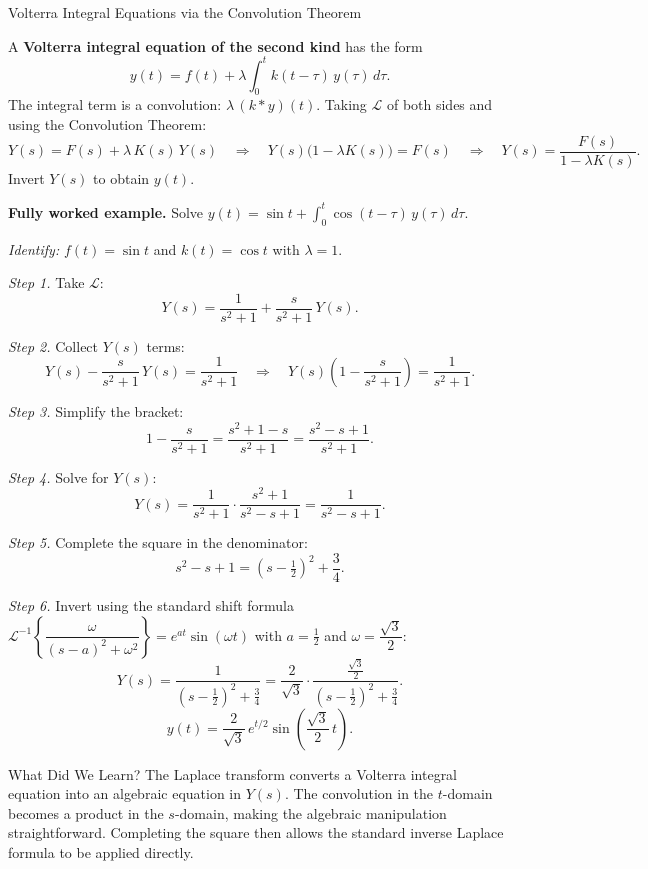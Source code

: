 \documentclass[12pt,a4paper]{article}
\begin{document}
\begin{infobox}{Volterra Integral Equations via the Convolution Theorem}

A \textbf{Volterra integral equation of the second kind} has the form
\[
  y(t) = f(t) + \lambda\int_0^t k(t-\tau)\,y(\tau)\,d\tau.
\]
The integral term is a convolution: $\lambda\,(k * y)(t)$.
Taking $\mathcal{L}$ of both sides and using the Convolution Theorem:
\[
  Y(s) = F(s) + \lambda\,K(s)\,Y(s)
  \quad\Longrightarrow\quad
  Y(s)\bigl(1 - \lambda K(s)\bigr) = F(s)
  \quad\Longrightarrow\quad
  Y(s) = \frac{F(s)}{1-\lambda K(s)}.
\]
Invert $Y(s)$ to obtain $y(t)$.

\medskip
\textbf{Fully worked example.} Solve
$\displaystyle y(t) = \sin t + \int_0^t \cos(t-\tau)\,y(\tau)\,d\tau$.

\textit{Identify:} $f(t) = \sin t$ and $k(t) = \cos t$ with $\lambda = 1$.

\textit{Step 1.} Take $\mathcal{L}$:
\[
  Y(s) = \frac{1}{s^2+1} + \frac{s}{s^2+1}\,Y(s).
\]

\textit{Step 2.} Collect $Y(s)$ terms:
\[
  Y(s) - \frac{s}{s^2+1}\,Y(s) = \frac{1}{s^2+1}
  \quad\Longrightarrow\quad
  Y(s)\left(1 - \frac{s}{s^2+1}\right) = \frac{1}{s^2+1}.
\]

\textit{Step 3.} Simplify the bracket:
\[
  1 - \frac{s}{s^2+1} = \frac{s^2+1-s}{s^2+1} = \frac{s^2-s+1}{s^2+1}.
\]

\textit{Step 4.} Solve for $Y(s)$:
\[
  Y(s) = \frac{1}{s^2+1}\cdot\frac{s^2+1}{s^2-s+1} = \frac{1}{s^2-s+1}.
\]

\textit{Step 5.} Complete the square in the denominator:
\[
  s^2 - s + 1 = \left(s - \tfrac{1}{2}\right)^2 + \frac{3}{4}.
\]

\textit{Step 6.} Invert using the standard shift formula
$\mathcal{L}^{-1}\!\left\{\dfrac{\omega}{(s-a)^2+\omega^2}\right\} = e^{at}\sin(\omega t)$
with $a = \tfrac{1}{2}$ and $\omega = \dfrac{\sqrt{3}}{2}$:
\[
  Y(s) = \frac{1}{(s-\frac{1}{2})^2+\frac{3}{4}}
        = \frac{2}{\sqrt{3}}\cdot\frac{\frac{\sqrt{3}}{2}}{(s-\frac{1}{2})^2+\frac{3}{4}}.
\]
\[
  \boxed{y(t) = \frac{2}{\sqrt{3}}\,e^{t/2}\sin\!\left(\frac{\sqrt{3}}{2}\,t\right).}
\]
\end{infobox}

\begin{learnbox}{What Did We Learn?}
The Laplace transform converts a Volterra integral equation into an algebraic
equation in $Y(s)$. The convolution in the $t$-domain becomes a product in the
$s$-domain, making the algebraic manipulation straightforward. Completing the
square then allows the standard inverse Laplace formula to be applied directly.
\end{learnbox}
\end{document}

